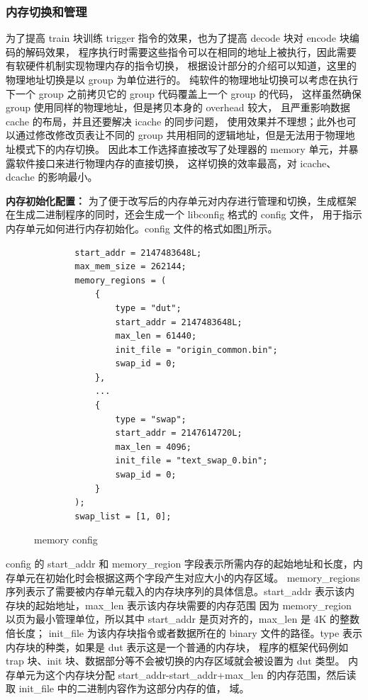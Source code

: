 \subsubsection{内存切换和管理}
为了提高 train 块训练 trigger 指令的效果，也为了提高 decode 块对 encode 块编码的解码效果，
程序执行时需要这些指令可以在相同的地址上被执行，因此需要有软硬件机制实现物理内存的指令切换，
根据设计部分的介绍可以知道，这里的物理地址切换是以 group 为单位进行的。
纯软件的物理地址切换可以考虑在执行下一个 group 之前拷贝它的 group 代码覆盖上一个 group 的代码，
这样虽然确保 group 使用同样的物理地址，但是拷贝本身的 overhead 较大，
且严重影响数据 cache 的布局，并且还要解决 icache 的同步问题，
使用效果并不理想；此外也可以通过修改修改页表让不同的 group 共用相同的逻辑地址，但是无法用于物理地址模式下的内存切换。
因此本工作选择直接改写了处理器的 memory 单元，并暴露软件接口来进行物理内存的直接切换，
这样切换的效率最高，对 icache、dcache 的影响最小。\par

\textbf{内存初始化配置：}
为了便于改写后的内存单元对内存进行管理和切换，生成框架在生成二进制程序的同时，还会生成一个 libconfig 格式的 config 文件，
用于指示内存单元如何进行内存初始化。config 文件的格式如图\ref{code:memory-config}所示。\par

\begin{figure}[htbp]
    \centering
    \begin{verbatim}
        start_addr = 2147483648L;
        max_mem_size = 262144;
        memory_regions = (
            {
                type = "dut";
                start_addr = 2147483648L;
                max_len = 61440;
                init_file = "origin_common.bin";
                swap_id = 0;
            },
            ...
            {
                type = "swap";
                start_addr = 2147614720L;
                max_len = 4096;
                init_file = "text_swap_0.bin";
                swap_id = 0;
            }
        );
        swap_list = [1, 0];
    \end{verbatim}
    \caption{memory config}
    \label{code:memory-config}
\end{figure}

config 的 start\_addr 和 memory\_region 字段表示所需内存的起始地址和长度，内存单元在初始化时会根据这两个字段产生对应大小的内存区域。
memory\_regions 序列表示了需要被内存单元载入的内存块序列的具体信息。start\_addr 表示该内存块的起始地址，max\_len 表示该内存块需要的内存范围
因为 memory\_region 以页为最小管理单位，所以其中 start\_addr 是页对齐的，max\_len 是 4K 的整数倍长度；
init\_file 为该内存块指令或者数据所在的 binary 文件的路径。type 表示内存块的种类，如果是 dut 表示这是一个普通的内存块，
程序的框架代码例如 trap 块、init 块、数据部分等不会被切换的内存区域就会被设置为 dut 类型。
内存单元为这个内存块分配 start\_addr-start\_addr+max\_len 的内存范围，然后读取 init\_file 中的二进制内容作为这部分内存的值，
域。\par

